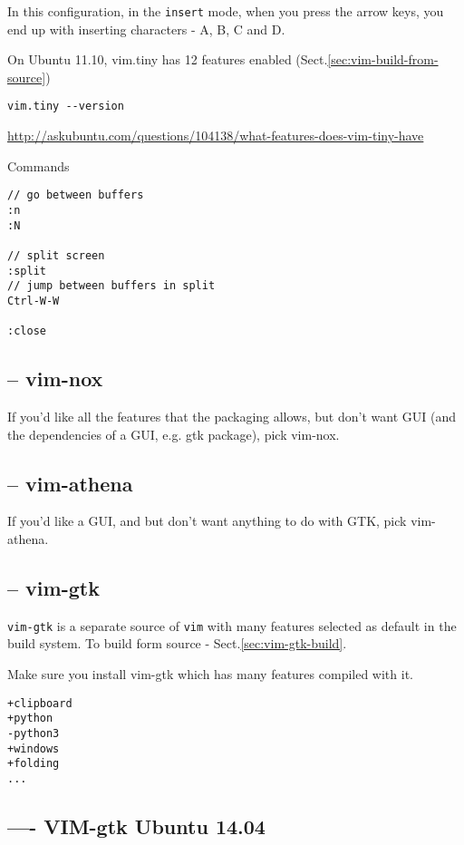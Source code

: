 In this configuration, in the \verb!insert! mode, when you press the arrow keys,
you end up with inserting characters - A, B, C and D.


On Ubuntu 11.10, vim.tiny has 12 features enabled
(Sect.\ref{sec:vim-build-from-source})
\begin{verbatim}
vim.tiny --version
\end{verbatim}
\url{http://askubuntu.com/questions/104138/what-features-does-vim-tiny-have}


Commands
\begin{verbatim}
// go between buffers
:n  
:N

// split screen
:split
// jump between buffers in split
Ctrl-W-W

:close 
\end{verbatim}




\subsection{-- vim-nox}
\label{sec:vim-nox}

If you'd like all the features that the packaging allows, but don't want GUI
(and the dependencies of a GUI, e.g. gtk package), pick vim-nox.


\subsection{-- vim-athena}
\label{sec:vim-athena}

If you'd like a GUI, and but don't want anything to do with GTK, pick
vim-athena.

\subsection{-- vim-gtk}
\label{sec:vim-gtk}

\verb!vim-gtk! is a separate source of \verb!vim! with many features selected as
default in the build system. To build form source -
Sect.\ref{sec:vim-gtk-build}.

Make sure you install vim-gtk which has many features compiled with it.
\begin{verbatim}
+clipboard
+python 
-python3
+windows
+folding
...
\end{verbatim}

\subsection{---- VIM-gtk Ubuntu 14.04}

